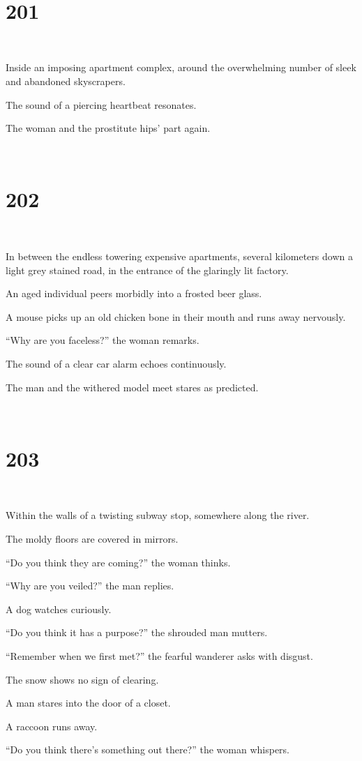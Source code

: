 \documentclass{report}
\begin{document}
~
\chapter*{201}
~

Inside an imposing apartment complex, around the overwhelming number of sleek and abandoned skyscrapers.

The sound of a piercing heartbeat resonates.

The woman and the prostitute hips' part again.

~
\chapter*{202}
~

In between the endless towering expensive apartments, several kilometers down a light grey stained road, in the entrance of the glaringly lit factory.

An aged individual peers morbidly into a frosted beer glass.

A mouse picks up an old chicken bone in their mouth and runs away nervously.

``Why are you faceless?'' the woman remarks.

The sound of a clear car alarm echoes continuously.

The man and the withered model meet stares as predicted.

~
\chapter*{203}
~

Within the walls of a twisting subway stop, somewhere along the river.

The moldy floors are covered in mirrors.

``Do you think they are coming?'' the woman thinks.

``Why are you veiled?'' the man replies.

A dog watches curiously.

``Do you think it has a purpose?'' the shrouded man mutters.

``Remember when we first met?'' the fearful wanderer asks with disgust.

The snow shows no sign of clearing.

A man stares into the door of a closet.

A raccoon runs away.

``Do you think there's something out there?'' the woman whispers.
\end{document}
